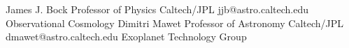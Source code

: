 

\begin{referees}
	{James J. Bock}
	{Professor of Physics}
	{Caltech/JPL}
	{jjb@astro.caltech.edu}
	{Observational Cosmology}
	{Dimitri Mawet}
	{Professor of Astronomy}
	{Caltech/JPL}
	{dmawet@astro.caltech.edu}
	{Exoplanet Technology Group}
\end{referees}